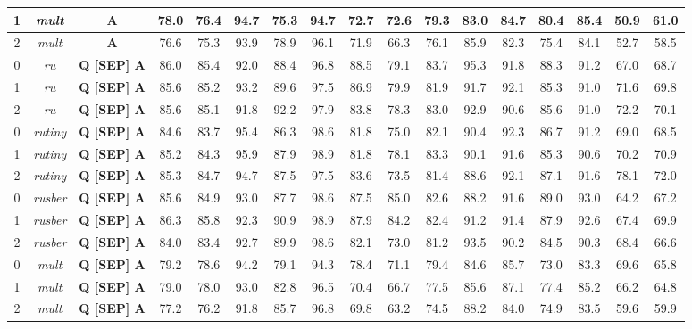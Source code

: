 \begin{table}[t]
{\begin{tabular}{|c|c||c|c|c|c|c|c|c|c|c|c|c|c|c|c|c|}
1 & \textit{mult} &  \textbf{A} & 78.0 & 76.4 & 94.7 & 75.3 & 94.7 & 72.7 & 72.6 & 79.3 & 83.0 & 84.7 & 80.4 & 85.4 & 50.9 & 61.0\\ \hline
2 & \textit{mult} &  \textbf{A} & 76.6 & 75.3 & 93.9 & 78.9 & 96.1 & 71.9 & 66.3 & 76.1 & 85.9 & 82.3 & 75.4 & 84.1 & 52.7 & 58.5\\ \hline
0 & \textit{ru} &  \textbf{Q [SEP] A} & 86.0 & 85.4 & 92.0 & 88.4 & 96.8 & 88.5 & 79.1 & 83.7 & 95.3 & 91.8 & 88.3 & 91.2 & 67.0 & 68.7\\ \hline
1 & \textit{ru} &  \textbf{Q [SEP] A} & 85.6 & 85.2 & 93.2 & 89.6 & 97.5 & 86.9 & 79.9 & 81.9 & 91.7 & 92.1 & 85.3 & 91.0 & 71.6 & 69.8\\ \hline
2 & \textit{ru} &  \textbf{Q [SEP] A} & 85.6 & 85.1 & 91.8 & 92.2 & 97.9 & 83.8 & 78.3 & 83.0 & 92.9 & 90.6 & 85.6 & 91.0 & 72.2 & 70.1\\ \hline
0 & \textit{rutiny} &  \textbf{Q [SEP] A} & 84.6 & 83.7 & 95.4 & 86.3 & 98.6 & 81.8 & 75.0 & 82.1 & 90.4 & 92.3 & 86.7 & 91.2 & 69.0 & 68.5\\ \hline
1 & \textit{rutiny} &  \textbf{Q [SEP] A} & 85.2 & 84.3 & 95.9 & 87.9 & 98.9 & 81.8 & 78.1 & 83.3 & 90.1 & 91.6 & 85.3 & 90.6 & 70.2 & 70.9\\ \hline
2 & \textit{rutiny} &  \textbf{Q [SEP] A} & 85.3 & 84.7 & 94.7 & 87.5 & 97.5 & 83.6 & 73.5 & 81.4 & 88.6 & 92.1 & 87.1 & 91.6 & 78.1 & 72.0\\ \hline
0 & \textit{rusber} &  \textbf{Q [SEP] A} & 85.6 & 84.9 & 93.0 & 87.7 & 98.6 & 87.5 & 85.0 & 82.6 & 88.2 & 91.6 & 89.0 & 93.0 & 64.2 & 67.2\\ \hline
1 & \textit{rusber} &  \textbf{Q [SEP] A} & 86.3 & 85.8 & 92.3 & 90.9 & 98.9 & 87.9 & 84.2 & 82.4 & 91.2 & 91.4 & 87.9 & 92.6 & 67.4 & 69.9\\ \hline
2 & \textit{rusber} &  \textbf{Q [SEP] A} & 84.0 & 83.4 & 92.7 & 89.9 & 98.6 & 82.1 & 73.0 & 81.2 & 93.5 & 90.2 & 84.5 & 90.3 & 68.4 & 66.6\\ \hline
0 & \textit{mult} &  \textbf{Q [SEP] A} & 79.2 & 78.6 & 94.2 & 79.1 & 94.3 & 78.4 & 71.1 & 79.4 & 84.6 & 85.7 & 73.0 & 83.3 & 69.6 & 65.8\\ \hline
1 & \textit{mult} &  \textbf{Q [SEP] A} & 79.0 & 78.0 & 93.0 & 82.8 & 96.5 & 70.4 & 66.7 & 77.5 & 85.6 & 87.1 & 77.4 & 85.2 & 66.2 & 64.8\\ \hline
2 & \textit{mult} &  \textbf{Q [SEP] A} & 77.2 & 76.2 & 91.8 & 85.7 & 96.8 & 69.8 & 63.2 & 74.5 & 88.2 & 84.0 & 74.9 & 83.5 & 59.6 & 59.9\\ \hline
\end{tabular}
}
\end{table}

